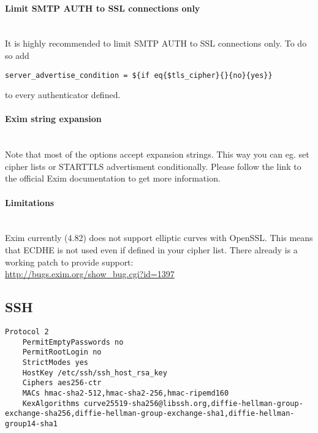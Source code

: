 \paragraph*{Limit SMTP AUTH to SSL connections only}\mbox{}\\

It is highly recommended to limit SMTP AUTH to SSL connections only. To do so add
\begin{lstlisting}[breaklines]
  server_advertise_condition = ${if eq{$tls_cipher}{}{no}{yes}}
\end{lstlisting}
to every authenticator defined.

\paragraph*{Exim string expansion}\mbox{}\\

Note that most of the options accept expansion strings. This way you can eg. set cipher lists or STARTTLS advertisment conditionally. Please follow the link to the official Exim documentation to get more information.

\paragraph*{Limitations}\mbox{}\\

Exim currently (4.82) does not support elliptic curves with OpenSSL. This means that ECDHE is not used even if defined in your cipher list.
There already is a working patch to provide support:\\
\url{http://bugs.exim.org/show_bug.cgi?id=1397}



\subsection{SSH}

\begin{lstlisting}[breaklines]
	Protocol 2
	PermitEmptyPasswords no
	PermitRootLogin no
	StrictModes yes
	HostKey /etc/ssh/ssh_host_rsa_key
	Ciphers aes256-ctr
	MACs hmac-sha2-512,hmac-sha2-256,hmac-ripemd160
	KexAlgorithms curve25519-sha256@libssh.org,diffie-hellman-group-exchange-sha256,diffie-hellman-group-exchange-sha1,diffie-hellman-group14-sha1
\end{lstlisting}


